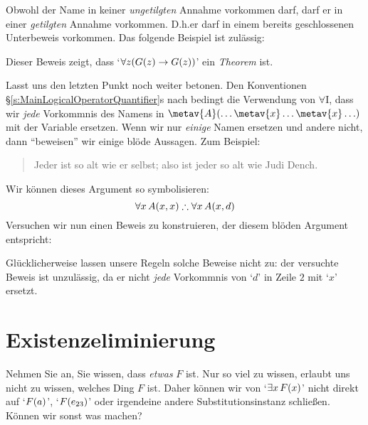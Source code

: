Obwohl der Name in keiner \emph{ungetilgten} Annahme vorkommen darf, darf er in einer \emph{getilgten} Annahme vorkommen. D.h.\@ er darf in einem bereits geschlossenen Unterbeweis vorkommen. Das folgende Beispiel ist zulässig:
\begin{fitchproof}
	\open
	\close
\end{fitchproof}
Dieser Beweis zeigt, dass `$\forall z (\mathord{G}(z) \rightarrow \mathord{G}(z))$' ein \emph{Theorem} ist.

Lasst uns den letzten Punkt noch weiter betonen. Den Konventionen \S\ref{s:MainLogicalOperatorQuantifier}s nach bedingt die Verwendung von $\forall$I, dass wir \emph{jede} Vorkommnis des Namens  in $\metav{A}(\ldots \metav{x}\ldots\metav{x}\ldots)$ mit der Variable  ersetzen. Wenn wir nur \emph{einige} Namen ersetzen und andere nicht, dann ``beweisen'' wir einige blöde Aussagen. Zum Beispiel:
	\begin{quote}
		Jeder ist so alt wie er selbst; also ist jeder so alt wie Judi Dench.
	\end{quote}
Wir können dieses Argument so symbolisieren:
$$\forall x\,\atom{A}{x,x} \therefore \forall x\,\atom{A}{x,d}$$
Versuchen wir nun einen Beweis zu konstruieren, der diesem blöden Argument entspricht:
\begin{fitchproof}
\end{fitchproof}
Glücklicherweise lassen unsere Regeln solche Beweise nicht zu: der versuchte Beweis ist unzulässig, da er nicht \emph{jede} Vorkommnis von `$d$' in Zeile $2$ mit `$x$' ersetzt.

\section{Existenzeliminierung}
Nehmen Sie an, Sie wissen, dass \emph{etwas} $F$ ist. Nur so viel zu wissen, erlaubt uns nicht zu wissen, welches Ding $F$ ist. Daher können wir von `$\exists x\,\mathord{F}(x)$' nicht direkt auf `$\mathord{F}(a)$', `$\mathord{F}(e_{23})$' oder irgendeine andere Substitutionsinstanz schlie{\ss}en. Können wir sonst was machen?

